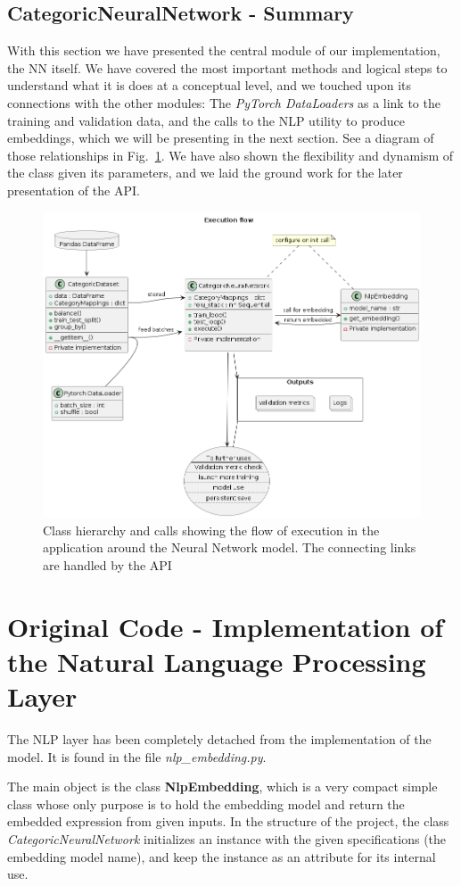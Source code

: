 \documentclass[a4paper, 11pt]{report}
\begin{document}
    \subsection{CategoricNeuralNetwork - Summary}
    With this section we have presented the central module of our implementation, the NN itself. We have covered the most important methods and logical steps to understand what it is does at a conceptual level, and we touched upon its connections with the other modules: The \textit{PyTorch DataLoaders} as a link to the training and validation data, and the calls to the NLP utility to produce embeddings, which we will be presenting in the next section. See a diagram of those relationships in Fig.~\ref{fig: Flow}.
    We have also shown the flexibility and dynamism of the class given its parameters, and we laid the ground work for the later presentation of the API.
   \begin{figure}[ht!]
       \centering
       \includegraphics[width=0.75\linewidth]{flow.png}
       \caption[Flow of the core application]{Class hierarchy and calls showing the flow of execution in the application around the Neural Network model. The connecting links are handled by the API}
       \label{fig: Flow}
   \end{figure}

   \section{Original Code - Implementation of the Natural Language Processing Layer}\label{Implementation: NLP}
   The NLP layer has been completely detached from the implementation of the model. It is found in the file \textit{nlp\_embedding.py}.

   The main object is the class \textbf{NlpEmbedding}, which is a very compact simple class whose only purpose is to hold the embedding model and return the embedded expression from given inputs. In the structure of the project, the class \textit{CategoricNeuralNetwork} initializes an instance with the given specifications (the embedding model name), and keep the instance as an attribute for its internal use.
\end{document}
